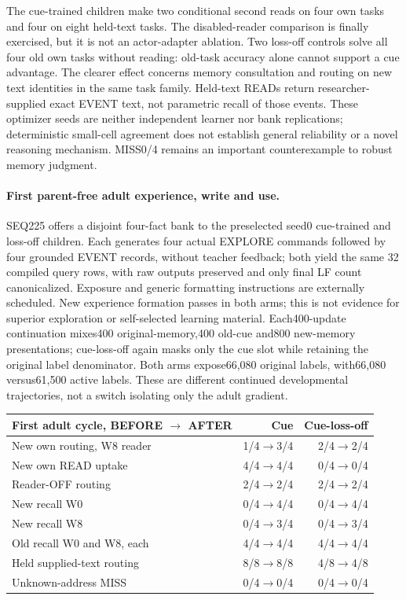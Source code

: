 \documentclass{article}
\begin{document}
The cue-trained children make two conditional second reads on four own tasks
and four on eight held-text tasks. The disabled-reader comparison is finally
exercised, but it is not an actor-adapter ablation. Two loss-off controls solve
all four old own tasks without reading: old-task accuracy alone cannot support
a cue advantage. The clearer effect concerns memory consultation and routing on
new text identities in the same task family. Held-text READs return
researcher-supplied exact EVENT text, not parametric recall of those events.
These optimizer seeds are neither
independent learner nor bank replications; deterministic small-cell agreement
does not establish general reliability or a novel reasoning mechanism.
MISS0/4 remains an important counterexample to robust memory judgment.

\paragraph{First parent-free adult experience, write and use.}
SEQ225 offers a disjoint four-fact bank to the preselected seed0 cue-trained
and loss-off children. Each generates four actual EXPLORE commands followed by
four grounded EVENT records, without teacher feedback; both yield the same
32 compiled query rows, with raw outputs preserved and only final LF count
canonicalized. Exposure and generic formatting instructions are externally
scheduled. New experience formation passes in both arms; this is not evidence
for superior exploration or self-selected learning material. Each400-update
continuation mixes400 original-memory,400 old-cue and800 new-memory
presentations; cue-loss-off again masks only the cue slot while retaining the
original label denominator. Both arms expose66,080 original labels, with66,080
versus61,500 active labels. These are different continued developmental
trajectories, not a switch isolating only the adult gradient.
\begin{center}
\begin{tabular}{lrr}
\toprule
First adult cycle, BEFORE $\to$ AFTER & Cue & Cue-loss-off \\
\midrule
New own routing, W8 reader &1/4$\to$3/4&2/4$\to$2/4\\
New own READ uptake &4/4$\to$4/4&0/4$\to$0/4\\
Reader-OFF routing &2/4$\to$2/4&2/4$\to$2/4\\
New recall W0 &0/4$\to$4/4&0/4$\to$4/4\\
New recall W8 &0/4$\to$3/4&0/4$\to$3/4\\
Old recall W0 and W8, each &4/4$\to$4/4&4/4$\to$4/4\\
Held supplied-text routing &8/8$\to$8/8&4/8$\to$4/8\\
Unknown-address MISS &0/4$\to$0/4&0/4$\to$0/4\\
\bottomrule
\end{tabular}
\end{center}
\end{document}
